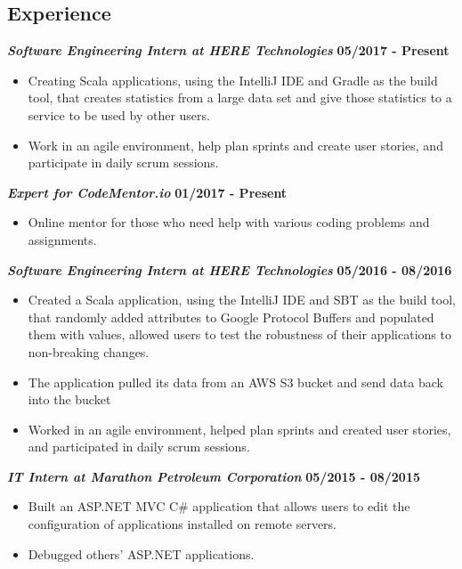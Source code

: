 \documentclass[10pt]{res}
\begin{document}
\begin{resume}
\section{Experience}
	\textbf{\textit{Software Engineering Intern at HERE Technologies}}
	\vspace*{.25em}
	\hfill{\bf 05/2017 - Present}
	\begin{itemize}
		\item Creating Scala applications, using the IntelliJ IDE and Gradle as the build tool, that creates statistics from a large data set and give those statistics to a service to be used by other users. 
\item Work in an agile environment, help plan sprints and create user stories, and participate in daily scrum sessions. 
	\end{itemize}
\textbf{\textit{Expert for CodeMentor.io}}
	\vspace*{.25em}
	\hfill{\bf 01/2017 - Present}
	\begin{itemize}
		\item Online mentor for those who need help with various coding problems and assignments. 
	\end{itemize}
	\textbf{\textit{Software Engineering Intern at HERE Technologies}}
	\vspace*{.25em}
	\hfill {\bf 05/2016 - 08/2016}
	\begin{itemize}
	  \item Created a Scala application, using the IntelliJ IDE and SBT as the build tool, that randomly added attributes to Google Protocol Buffers 
 and populated them with values, allowed users to test the robustness of their applications to non-breaking changes.
	\item The application pulled its data from an AWS S3 bucket and send data back into the bucket
\item Worked in an agile environment, helped plan sprints and created user stories, and participated in daily scrum sessions. 
	\end{itemize}  
	\textbf{\textit{IT Intern at Marathon Petroleum Corporation}} \hfill {\bf 05/2015 - 08/2015}
	\vspace*{.25em}
	\begin{itemize}
  \setlength\itemsep{0em}
	  \item Built an ASP.NET MVC C\# application that allows users to edit the configuration of applications installed on remote servers.
	  \item Debugged others' ASP.NET applications.
\end{itemize}


\end{resume}
\end{document}
